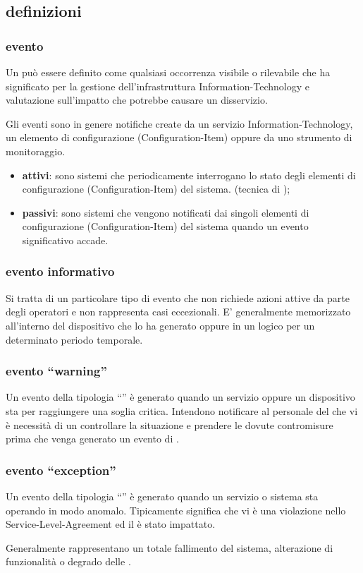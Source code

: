 \subsection[Definizioni]{definizioni}
\label{em-introduction-definitions}

\subsubsection{evento}
Un  può essere definito come qualsiasi occorrenza visibile o rilevabile che ha significato per la gestione dell'infrastruttura \acs{Information-Technology} e valutazione sull'impatto che potrebbe causare un disservizio.

Gli eventi sono in genere notifiche create da un servizio \acs{Information-Technology}, un elemento di configurazione (\acs{Configuration-Item}) oppure da uno strumento di monitoraggio.

\begin{itemize}
\item{\textbf{attivi}: sono sistemi che periodicamente interrogano lo stato degli elementi di configurazione (\ac{Configuration-Item}) del sistema. (tecnica di );}
\item{\textbf{passivi}: sono sistemi che vengono notificati dai singoli elementi di configurazione (\ac{Configuration-Item}) del sistema quando un evento significativo accade.}
\end{itemize}

\subsubsection{evento informativo}
Si tratta di un particolare tipo di evento che non richiede azioni attive da parte degli operatori e non rappresenta casi eccezionali. E' generalmente memorizzato all'interno del dispositivo che lo ha generato oppure in un  logico per un determinato periodo temporale.

\subsubsection{evento ``warning''}
Un evento della tipologia ``'' è generato quando un servizio oppure un dispositivo sta per raggiungere una soglia critica. Intendono notificare al personale del  che vi è necessità di un controllare la situazione e prendere le dovute contromisure prima che venga generato un evento di .

\subsubsection{evento ``exception''}
Un evento della tipologia ``'' è generato quando un servizio o sistema sta operando in modo anomalo. Tipicamente significa che vi è una violazione nello \ac{Service-Level-Agreement} ed il  è stato impattato.

Generalmente rappresentano un totale fallimento del sistema, alterazione di funzionalità o degrado delle .